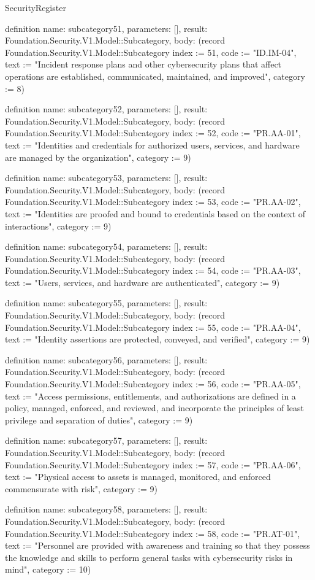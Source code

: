\begin{lexlean}{SecurityRegister}
\begin{semanticmodule}
definition{
  name: subcategory51,
  parameters: [],
  result: Foundation.Security.V1.Model::Subcategory,
  body: (record Foundation.Security.V1.Model::Subcategory {index := 51, code := "ID.IM-04", text := "Incident response plans and other cybersecurity plans that affect operations are established, communicated, maintained, and improved", category := 8})
}

definition{
  name: subcategory52,
  parameters: [],
  result: Foundation.Security.V1.Model::Subcategory,
  body: (record Foundation.Security.V1.Model::Subcategory {index := 52, code := "PR.AA-01", text := "Identities and credentials for authorized users, services, and hardware are managed by the organization", category := 9})
}

definition{
  name: subcategory53,
  parameters: [],
  result: Foundation.Security.V1.Model::Subcategory,
  body: (record Foundation.Security.V1.Model::Subcategory {index := 53, code := "PR.AA-02", text := "Identities are proofed and bound to credentials based on the context of interactions", category := 9})
}

definition{
  name: subcategory54,
  parameters: [],
  result: Foundation.Security.V1.Model::Subcategory,
  body: (record Foundation.Security.V1.Model::Subcategory {index := 54, code := "PR.AA-03", text := "Users, services, and hardware are authenticated", category := 9})
}

definition{
  name: subcategory55,
  parameters: [],
  result: Foundation.Security.V1.Model::Subcategory,
  body: (record Foundation.Security.V1.Model::Subcategory {index := 55, code := "PR.AA-04", text := "Identity assertions are protected, conveyed, and verified", category := 9})
}

definition{
  name: subcategory56,
  parameters: [],
  result: Foundation.Security.V1.Model::Subcategory,
  body: (record Foundation.Security.V1.Model::Subcategory {index := 56, code := "PR.AA-05", text := "Access permissions, entitlements, and authorizations are defined in a policy, managed, enforced, and reviewed, and incorporate the principles of least privilege and separation of duties", category := 9})
}

definition{
  name: subcategory57,
  parameters: [],
  result: Foundation.Security.V1.Model::Subcategory,
  body: (record Foundation.Security.V1.Model::Subcategory {index := 57, code := "PR.AA-06", text := "Physical access to assets is managed, monitored, and enforced commensurate with risk", category := 9})
}

definition{
  name: subcategory58,
  parameters: [],
  result: Foundation.Security.V1.Model::Subcategory,
  body: (record Foundation.Security.V1.Model::Subcategory {index := 58, code := "PR.AT-01", text := "Personnel are provided with awareness and training so that they possess the knowledge and skills to perform general tasks with cybersecurity risks in mind", category := 10})
}


\end{semanticmodule}
\end{lexlean}

